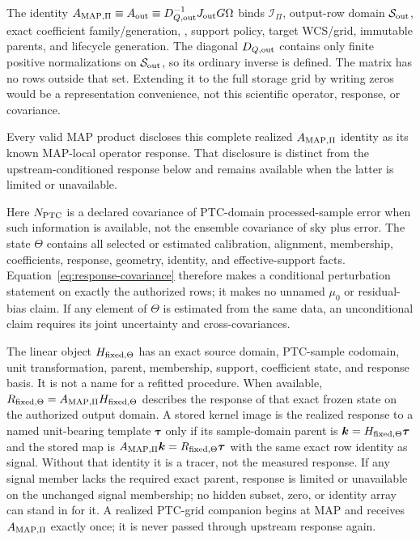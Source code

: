 \documentclass[10pt]{article}
\begin{document}
\SCIMapOperatorEquations

The identity \(A_{{\rm MAP},\Pi}\equiv A_{\rm out}\equiv
D_{Q,{\rm out}}^{-1}J_{\rm out}G\Omega\) binds \(\mathcal I_\Pi\), output-row
domain \(\mathcal S_{\rm out}\), exact coefficient family/generation,
\SCIMapOneHotProfile, support policy, target WCS/grid,
immutable parents, and lifecycle generation. The diagonal
\(D_{Q,{\rm out}}\) contains only finite positive normalizations
on \(\mathcal S_{\rm out}\), so its ordinary inverse is defined. The matrix
has no rows outside that set. Extending it to the full storage
grid by writing zeros would be a representation convenience, not this
scientific operator, response, or covariance.

Every valid MAP product discloses this complete realized
\(A_{{\rm MAP},\Pi}\) identity as its known MAP-local operator response.
That disclosure is distinct from the upstream-conditioned response below and
remains available when the latter is limited or unavailable.

Here \(N_{\rm PTC}\) is a declared covariance of PTC-domain processed-sample
error when such information is available, not the ensemble
covariance of sky plus error. The state \(\Theta\) contains all selected or
estimated calibration, alignment, membership, coefficients, response,
geometry, identity, and effective-support facts.
Equation~\eqref{eq:response-covariance} therefore makes a conditional
perturbation statement on exactly the authorized rows; it makes no unnamed
\(\mu_0\) or residual-bias claim. If any element of \(\Theta\) is
estimated from the same data, an unconditional claim requires its joint
uncertainty and cross-covariances.

The linear object \(H_{{\rm fixed},\Theta}\) has an exact source domain,
PTC-sample codomain, unit transformation, parent, membership, support,
coefficient state, and response basis. It is not a name for a refitted
procedure. When available,
\(R_{{\rm fixed},\Theta}=A_{{\rm MAP},\Pi}H_{{\rm fixed},\Theta}\) describes
the response of that exact frozen state on the authorized output domain.
A stored kernel image is the realized response to a named unit-bearing
template \(\boldsymbol\tau\) only if its sample-domain parent is
\(\boldsymbol k=H_{{\rm fixed},\Theta}\boldsymbol\tau\) and the stored map is
\(A_{{\rm MAP},\Pi}\boldsymbol k=R_{{\rm fixed},\Theta}\boldsymbol\tau\) with the same exact row
identity as signal. Without that identity it is a tracer, not the measured
response. If any signal member lacks the required exact parent, response is
limited or unavailable on the unchanged signal membership; no hidden subset,
zero, or identity array can stand in for it. A realized PTC-grid companion
begins at MAP and receives \(A_{{\rm MAP},\Pi}\) exactly once; it is never
passed through upstream response again.
\end{document}
